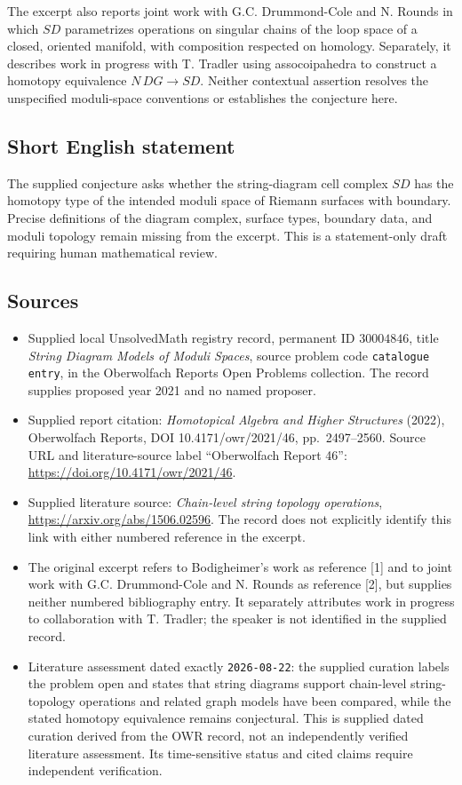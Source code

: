 \documentclass[11pt]{article}
\begin{document}
The excerpt also reports joint work with G.C. Drummond-Cole and N. Rounds in which \(SD\) parametrizes operations on singular chains of the loop space of a closed, oriented manifold, with composition respected on homology. Separately, it describes work in progress with T. Tradler using assocoipahedra to construct a homotopy equivalence \(N\,DG\to SD\). Neither contextual assertion resolves the unspecified moduli-space conventions or establishes the conjecture here.
\subsection{Short English statement}
The supplied conjecture asks whether the string-diagram cell complex \(SD\) has the homotopy type of the intended moduli space of Riemann surfaces with boundary. Precise definitions of the diagram complex, surface types, boundary data, and moduli topology remain missing from the excerpt. This is a statement-only draft requiring human mathematical review.
\subsection{Sources}
\begin{itemize}
\item Supplied local UnsolvedMath registry record, permanent ID \(30004846\), title \emph{String Diagram Models of Moduli Spaces}, source problem code \texttt{catalogue entry}, in the Oberwolfach Reports Open Problems collection. The record supplies proposed year 2021 and no named proposer.
\item Supplied report citation: \emph{Homotopical Algebra and Higher Structures} (2022), Oberwolfach Reports, DOI 10.4171/owr/2021/46, pp.\ 2497--2560. Source URL and literature-source label ``Oberwolfach Report 46'': \url{https://doi.org/10.4171/owr/2021/46}.
\item Supplied literature source: \emph{Chain-level string topology operations}, \url{https://arxiv.org/abs/1506.02596}. The record does not explicitly identify this link with either numbered reference in the excerpt.
\item The original excerpt refers to Bodigheimer's work as reference [1] and to joint work with G.C. Drummond-Cole and N. Rounds as reference [2], but supplies neither numbered bibliography entry. It separately attributes work in progress to collaboration with T. Tradler; the speaker is not identified in the supplied record.
\item Literature assessment dated exactly \texttt{2026-08-22}: the supplied curation labels the problem open and states that string diagrams support chain-level string-topology operations and related graph models have been compared, while the stated homotopy equivalence remains conjectural. This is supplied dated curation derived from the OWR record, not an independently verified literature assessment. Its time-sensitive status and cited claims require independent verification.
\end{itemize}
\end{document}
